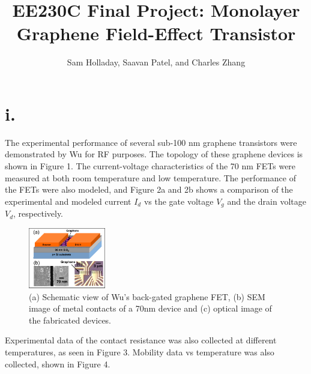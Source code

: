 \documentclass[11pt]{article}
\title{EE230C Final Project: Monolayer Graphene Field-Effect Transistor}
\author{Sam Holladay, Saavan Patel, and Charles Zhang}
\date{}
\begin{document}
\maketitle

\section*{i.} The experimental performance of several sub-100 nm graphene transistors were demonstrated by Wu for RF purposes\cite{wu2010}. The topology of these graphene devices is shown in Figure 1. The current-voltage characteristics of the 70 nm FETs were measured at both room temperature and low temperature. The performance of the FETs were also modeled, and Figure 2a and 2b shows a comparison of the experimental and modeled current $I_d$ vs the gate voltage $V_g$ and the drain voltage $V_d$, respectively. 
\begin{figure}[h!]
\centering 
\includegraphics[width=0.3\textwidth]{paper1_fet.png}
\caption{(a) Schematic view of Wu's back-gated graphene FET, (b) SEM image of metal contacts of a 70nm device and (c) optical image of the fabricated devices.}\label{fig:FET}
\end{figure}

Experimental data of the contact resistance was also collected at different temperatures, as seen in Figure 3. Mobility data vs temperature was also collected, shown in Figure 4.
\end{document}
